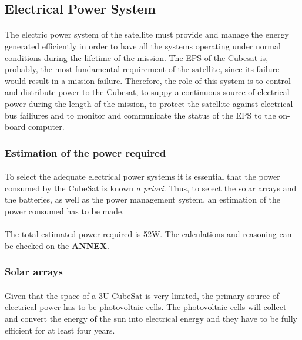 \subsection{Electrical Power System}

\paragraph{}The electric power system of the satellite must provide and manage the energy generated efficiently in order to have all the systems operating under normal conditions during the lifetime of the mission. The EPS of the Cubesat is, probably, the most fundamental requirement of the satellite, since its failure would result in a mission failure. Therefore, the role of this system is to control and distribute power to the Cubesat, to suppy a continuous source of electrical power during the length of the mission, to protect the satellite against electrical bus failiures and to monitor and communicate the status of the EPS to the on-board computer.

\subsubsection{Estimation of the power required}
\paragraph{}To select the adequate electrical power systems it is essential that the power consumed by the CubeSat is known \textit{a priori}. Thus, to select the solar arrays and the batteries, as well as the power management system, an estimation of the power consumed has to be made.

\paragraph{}The total estimated power required is 52W. The calculations and reasoning can be checked on the \textbf{ANNEX}.

\subsubsection{Solar arrays}

\paragraph{}Given that the space of a 3U CubeSat is very limited, the primary source of electrical power has to be photovoltaic cells. The photovoltaic cells will collect and convert the energy of the sun into electrical energy and they have to be fully efficient for at least four years. 


